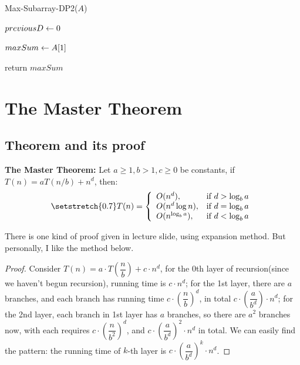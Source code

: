 \begin{spacing}{1.3}
    \begin{algorithm}[H]
        \caption{Max-Subarray-DP2($A$)}
        $previousD\leftarrow 0$ 

        $maxSum\leftarrow A[1]$

        return $maxSum$
    \end{algorithm}

    \newpage
    \section{The Master Theorem}

    \subsection{Theorem and its proof}

    {\bf The Master Theorem:} Let $a\ge 1, b>1, c\ge 0$
    be constants, if $T(n)=aT(n/b)+n^d$, then:
    \begin{align*}
        \setstretch{0.7}
        T(n)=\left\{ \begin{array}{ll}
            O(n^d), & \text{if } d>\log_b{a}\\
            O(n^d\log n), & \text{if } d = \log_b{a}\\
            O(n^{\log_b{a}}), & \text{if } d < \log_b{a}\\
        \end{array}\right.
    \end{align*}

    There is one kind of proof given in lecture slide, 
    using expansion method. But personally, I like the method below.

    \begin{proof}
    Consider $T(n)=a\cdot T\left(\dfrac{n}{b}\right)+c\cdot n^{d}$,
    for the 0th layer of recursion(since we haven't begun recursion),
    running time is $c\cdot n^{d}$;
    for the 1st layer, there are $a$ branches, and each
    branch has running time $c\cdot \left(\dfrac{n}{b}\right)^d$, 
    in total $c\cdot \left(\dfrac{a}{b^d}\right)\cdot n^d$;
    for the 2nd layer, each branch in 1st layer has $a$ branches,
    so there are $a^2$ branches now, with each requires 
    $c\cdot \left(\dfrac{n}{b^2}\right)^d$, and 
    $c\cdot \left(\dfrac{a}{b^d}\right)^2\cdot n^d$ in total.
    We can easily find the pattern: 
    the running time of $k$-th layer is 
    $c\cdot \left(\dfrac{a}{b^d}\right)^k\cdot n^d$.


\end{proof}
\end{spacing}
